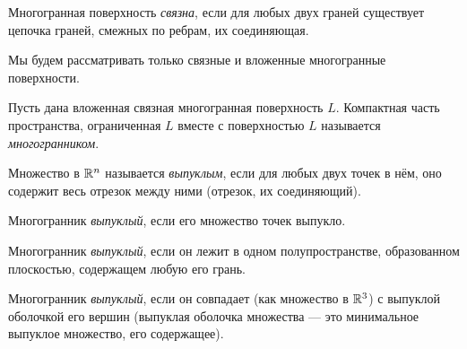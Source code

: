 \begin{definition}
    Многогранная поверхность \textit{связна}, если для любых двух граней существует цепочка граней, смежных по ребрам, их соединяющая.
\end{definition}

\begin{remark}
    Мы будем рассматривать только связные и вложенные многогранные поверхности.
\end{remark}

\begin{definition}
    Пусть дана вложенная связная многогранная поверхность $L$. Компактная часть пространства, ограниченная $L$ вместе с поверхностью $L$ называется \textit{многогранником}.
\end{definition}

\begin{definition}
    Множество в $\mathbb{R}^n$ называется \textit{выпуклым}, если для любых двух точек в нём, оно содержит весь отрезок между ними (отрезок, их соединяющий).
\end{definition}

\begin{definition}[1]
    Многогранник \textit{выпуклый}, если его множество точек выпукло.
\end{definition}

\begin{definition}[2]
    Многогранник \textit{выпуклый}, если он лежит в одном полупространстве, образованном плоскостью, содержащем любую его грань.
\end{definition}

\begin{definition}[3]
    Многогранник \textit{выпуклый}, если он совпадает (как множество в $\mathbb{R}^3$) с выпуклой оболочкой его вершин (выпуклая оболочка множества — это минимальное выпуклое множество, его содержащее).
\end{definition}

